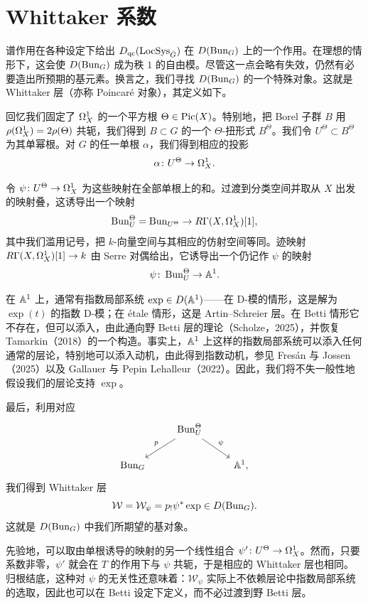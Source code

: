 \section{Whittaker 系数}

谱作用在各种设定下给出 $D_{\mathrm{qc}}(\operatorname{LocSys}_{\check{G}})$ 在 $D(\operatorname{Bun}_G)$ 上的一个作用。在理想的情形下，这会使 $D(\operatorname{Bun}_G)$ 成为秩 $1$ 的自由模。尽管这一点会略有失效，仍然有必要造出所预期的基元素。换言之，我们寻找 $D(\operatorname{Bun}_G)$ 的一个特殊对象。这就是 Whittaker 层（亦称 Poincaré 对象），其定义如下。

回忆我们固定了 $\Omega^{1}_{X}$ 的一个平方根 $\Theta\in\operatorname{Pic}(X)$。特别地，把 Borel 子群 $B$ 用 $\rho(\Omega^{1}_{X})=2\rho(\Theta)$ 共轭，我们得到 $B\subset G$ 的一个 $\Theta$-扭形式 $B^{\Theta}$。我们令 $U^{\Theta}\subset B^{\Theta}$ 为其单幂根。对 $G$ 的任一单根 $\alpha$，我们得到相应的投影
\[
\alpha\colon U^{\Theta}\to\Omega^{1}_{X}.
\]

令 $\psi\colon U^{\Theta}\to\Omega^{1}_{X}$ 为这些映射在全部单根上的和。过渡到分类空间并取从 $X$ 出发的映射叠，这诱导出一个映射
\[
\operatorname{Bun}^{\Theta}_{U}=\operatorname{Bun}_{U^{\Theta}}\to R\Gamma(X,\Omega^{1}_{X})[1],
\]
其中我们滥用记号，把 $k$-向量空间与其相应的仿射空间等同。迹映射 $R\Gamma(X,\Omega^{1}_{X})[1]\to k$ 由 Serre 对偶给出，它诱导出一个仍记作 $\psi$ 的映射
\[
\psi\colon \operatorname{Bun}^{\Theta}_{U}\to\mathbb{A}^{1}.
\]

在 $\mathbb{A}^{1}$ 上，通常有指数局部系统 $\exp\in D(\mathbb{A}^{1})$——在 D-模的情形，这是解为 $\exp(t)$ 的指数 D-模；在 étale 情形，这是 Artin--Schreier 层。在 Betti 情形它不存在，但可以添入，由此通向野 Betti 层的理论（Scholze，2025），并恢复 Tamarkin（2018）的一个构造。事实上，$\mathbb{A}^{1}$ 上这样的指数局部系统可以添入任何通常的层论，特别地可以添入动机，由此得到指数动机，参见 Fresán 与 Jossen（2025）以及 Gallauer 与 Pepin Lehalleur（2022）。因此，我们将不失一般性地假设我们的层论支持 $\exp$。

最后，利用对应
\[
\begin{tikzcd}
 & \Bun^{\Theta}_{U} \arrow[dl, "p"'] \arrow[dr, "\psi"] & \\
 \Bun_{G} & & \A^{1},
\end{tikzcd}
\]
我们得到 Whittaker 层
\[
\mathcal{W}=\mathcal{W}_{\psi}=p_{!}\psi^{*}\exp\in D(\operatorname{Bun}_{G}).
\]
这就是 $D(\operatorname{Bun}_{G})$ 中我们所期望的基对象。

\begin{remark}
先验地，可以取由单根诱导的映射的另一个线性组合 $\psi'\colon U^{\Theta}\to\Omega^{1}_{X}$。然而，只要系数非零，$\psi'$ 就会在 $T$ 的作用下与 $\psi$ 共轭，于是相应的 Whittaker 层也相同。归根结底，这种对 $\psi$ 的无关性还意味着：$\mathcal{W}_{\psi}$ 实际上不依赖层论中指数局部系统的选取，因此也可以在 Betti 设定下定义，而不必过渡到野 Betti 层。
\end{remark}

